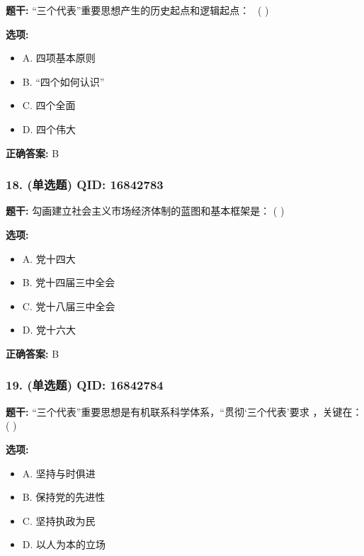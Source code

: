 \documentclass[12pt,UTF8]{ctexart}
\begin{document}
\textbf{题干:}
“三个代表”重要思想产生的历史起点和逻辑起点：  ( )

\textbf{选项:}
\begin{itemize}[leftmargin=*]

  \item A. 四项基本原则

  \item B. “四个如何认识”

  \item C. 四个全面

  \item D. 四个伟大

\end{itemize}

\textbf{正确答案:}
B

\vspace{0.3em}\hrulefill\vspace{0.7em}

\subsubsection*{18. (单选题) \small QID: 16842783}

\textbf{题干:}
勾画建立社会主义市场经济体制的蓝图和基本框架是： ( )

\textbf{选项:}
\begin{itemize}[leftmargin=*]

  \item A. 党十四大

  \item B. 党十四届三中全会

  \item C. 党十八届三中全会

  \item D. 党十六大

\end{itemize}

\textbf{正确答案:}
B

\vspace{0.3em}\hrulefill\vspace{0.7em}

\subsubsection*{19. (单选题) \small QID: 16842784}

\textbf{题干:}
“三个代表”重要思想是有机联系科学体系，“贯彻‘三个代表’要求 ，关键在： ( )

\textbf{选项:}
\begin{itemize}[leftmargin=*]

  \item A. 坚持与时俱进

  \item B. 保持党的先进性

  \item C. 坚持执政为民

  \item D. 以人为本的立场

\end{itemize}
\end{document}
